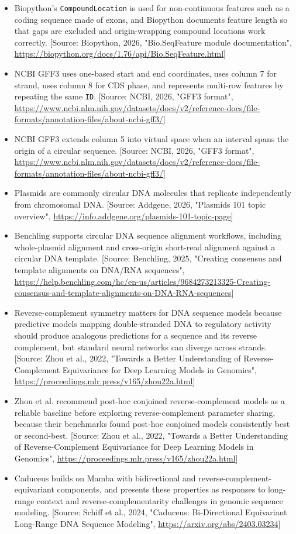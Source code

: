\documentclass[11pt]{report}
\begin{document}
\begin{itemize}
\item Biopython's \texttt{CompoundLocation} is used for non-continuous features such as a coding sequence made of exons, and Biopython documents feature length so that gaps are excluded and origin-wrapping compound locations work correctly. [Source: Biopython, 2026, "Bio.SeqFeature module documentation", \url{https://biopython.org/docs/1.76/api/Bio.SeqFeature.html}]
\item NCBI GFF3 uses one-based start and end coordinates, uses column 7 for strand, uses column 8 for CDS phase, and represents multi-row features by repeating the same \texttt{ID}. [Source: NCBI, 2026, "GFF3 format", \url{https://www.ncbi.nlm.nih.gov/datasets/docs/v2/reference-docs/file-formats/annotation-files/about-ncbi-gff3/}]
\item NCBI GFF3 extends column 5 into virtual space when an interval spans the origin of a circular sequence. [Source: NCBI, 2026, "GFF3 format", \url{https://www.ncbi.nlm.nih.gov/datasets/docs/v2/reference-docs/file-formats/annotation-files/about-ncbi-gff3/}]
\item Plasmids are commonly circular DNA molecules that replicate independently from chromosomal DNA. [Source: Addgene, 2026, "Plasmids 101 topic overview", \url{https://info.addgene.org/plasmids-101-topic-page}]
\item Benchling supports circular DNA sequence alignment workflows, including whole-plasmid alignment and cross-origin short-read alignment against a circular DNA template. [Source: Benchling, 2025, "Creating consensus and template alignments on DNA/RNA sequences", \url{https://help.benchling.com/hc/en-us/articles/9684273213325-Creating-consensus-and-template-alignments-on-DNA-RNA-sequences}]
\item Reverse-complement symmetry matters for DNA sequence models because predictive models mapping double-stranded DNA to regulatory activity should produce analogous predictions for a sequence and its reverse complement, but standard neural networks can diverge across strands. [Source: Zhou et al., 2022, "Towards a Better Understanding of Reverse-Complement Equivariance for Deep Learning Models in Genomics", \url{https://proceedings.mlr.press/v165/zhou22a.html}]
\item Zhou et al. recommend post-hoc conjoined reverse-complement models as a reliable baseline before exploring reverse-complement parameter sharing, because their benchmarks found post-hoc conjoined models consistently best or second-best. [Source: Zhou et al., 2022, "Towards a Better Understanding of Reverse-Complement Equivariance for Deep Learning Models in Genomics", \url{https://proceedings.mlr.press/v165/zhou22a.html}]
\item Caduceus builds on Mamba with bidirectional and reverse-complement-equivariant components, and presents these properties as responses to long-range context and reverse-complementarity challenges in genomic sequence modeling. [Source: Schiff et al., 2024, "Caduceus: Bi-Directional Equivariant Long-Range DNA Sequence Modeling", \url{https://arxiv.org/abs/2403.03234}]
\end{itemize}
\end{document}

